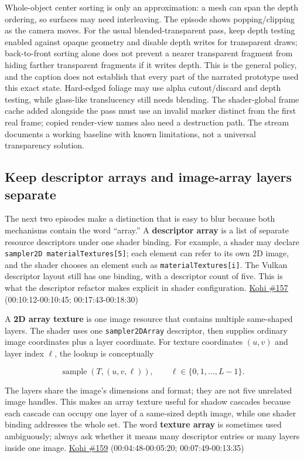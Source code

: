 Whole-object center sorting is only an approximation: a mesh can span the depth ordering, so surfaces may need interleaving. The episode shows popping/clipping as the camera moves. For the usual blended-transparent pass, keep depth testing enabled against opaque geometry and disable depth writes for transparent draws; back-to-front sorting alone does not prevent a nearer transparent fragment from hiding farther transparent fragments if it writes depth. This is the general policy, and the caption does not establish that every part of the narrated prototype used this exact state. Hard-edged foliage may use alpha cutout/discard and depth testing, while glass-like translucency still needs blending. The shader-global frame cache added alongside the pass must use an invalid marker distinct from the first real frame; copied render-view names also need a destruction path. The stream documents a working baseline with known limitations, not a universal transparency solution.

\subsection{Keep descriptor arrays and image-array layers separate}\label{06-engine-ii-ch025-keep-descriptor-arrays-and-image-array-layers-separate}

The next two episodes make a distinction that is easy to blur because both mechanisms contain the word ``array.'' A \textbf{descriptor array} is a list of separate resource descriptors under one shader binding. For example, a shader may declare \texttt{sampler2D\ materialTextures{[}5{]}}; each element can refer to its own 2D image, and the shader chooses an element such as \texttt{materialTextures{[}i{]}}. The Vulkan descriptor layout still has one binding, with a descriptor count of five. This is what the descriptor refactor makes explicit in shader configuration. \href{https://www.youtube.com/watch?v=ZmZUmsqUN6Q}{Kohi \#157} (00:10:12-00:10:45; 00:17:43-00:18:30)

A \textbf{2D array texture} is one image resource that contains multiple same-shaped layers. The shader uses one \texttt{sampler2DArray} descriptor, then supplies ordinary image coordinates plus a layer coordinate. For texture coordinates \((u,v)\) and layer index \(\ell\), the lookup is conceptually

\[\operatorname{sample}(T,(u,v,\ell)),\qquad \ell\in\{0,1,\ldots,L-1\}.\]

The layers share the image's dimensions and format; they are not five unrelated image handles. This makes an array texture useful for shadow cascades because each cascade can occupy one layer of a same-sized depth image, while one shader binding addresses the whole set. The word \textbf{texture array} is sometimes used ambiguously; always ask whether it means many descriptor entries or many layers inside one image. \href{https://www.youtube.com/watch?v=FrtHF-9K1HI}{Kohi \#159} (00:04:48-00:05:20; 00:07:49-00:13:35)

